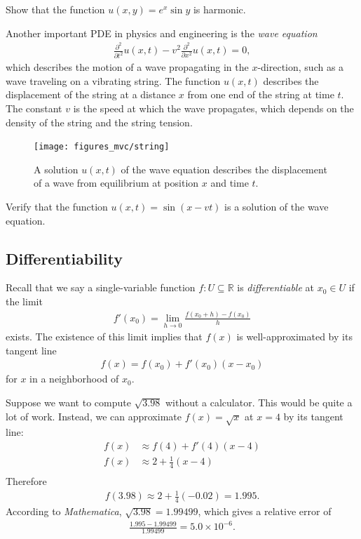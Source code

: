 \documentclass[12pt,letterpaper,reqno]{article}
\numberwithin{equation}{section}
\newcommand{\R}{\ensuremath{\mathbb R}}
\begin{document}
{\begin{exercise}
Show that the function $u(x,y)=e^x\sin y$ is harmonic.	
\end{exercise}

Another important PDE in physics and engineering is the \emph{wave equation}
\begin{align*}
	\frac{\partial^2}{\partial t^2}u(x,t)-v^2\frac{\partial^2}{\partial x^2}u(x,t)=0,
\end{align*}
which describes the motion of a wave propagating in the $x$-direction, such as a wave traveling on a vibrating string. The function $u(x,t)$ describes the displacement of the string at a distance $x$ from one end of the string at time $t$. The constant $v$ is the speed at which the wave propagates, which depends on the density of the string and the string tension.

\begin{figure}[h]
	\begin{center}
		\texttt{[image: figures\_mvc/string]}
	\end{center}
\caption{A solution $u(x,t)$ of the wave equation describes the displacement of a wave from equilibrium at position $x$ and time $t$.}
\end{figure}

\begin{exercise}
Verify that the function $u(x,t)=\sin(x-vt)$ is a solution of the wave equation.	
\end{exercise}



\subsection{Differentiability}
Recall that we say a single-variable function $f:U \subseteq \R$ is \emph{differentiable} at $x_0 \in U$ if the limit
\begin{align}\label{eq:old_derivative}
	f'(x_0)=\lim_{h \to 0}\frac{f(x_0+h)-f(x_0)}{h}
\end{align}
exists. The existence of this limit implies that $f(x)$ is well-approximated by its tangent line
\begin{align*}
	f(x)=f(x_0)+f'(x_0)(x-x_0)
\end{align*}
for $x$ in a neighborhood of $x_0$.

\begin{example}
Suppose we want to compute $\sqrt{3.98}$ without a calculator. This would be quite a lot of work. Instead, we can approximate $f(x)=\sqrt{x}$ at $x=4$ by its tangent line:
\begin{align*}
	f(x)&\approx f(4)+f'(4)(x-4) \\
	f(x)&\approx 2+\frac{1}{4}(x-4) \\
\end{align*}
Therefore
\begin{align*}
	f(3.98)\approx 2+\frac{1}{4}(-0.02)=1.995.
\end{align*}
According to \emph{Mathematica}, $\sqrt{3.98}=1.99499$, which gives a relative error of
\begin{align*}
	\frac{1.995-1.99499}{1.99499}=5.0 \times 10^{-6}.
\end{align*}	
\end{example}

}
\end{document}
